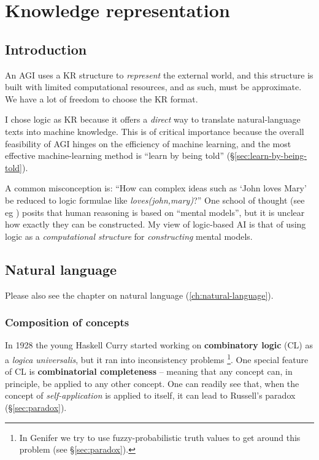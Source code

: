 \chapter{Knowledge representation}
\minitoc

\section{Introduction}

An AGI uses a KR structure to \textit{represent} the external world, and this structure is built with limited computational resources, and as such, must be approximate.  We have a lot of freedom to choose the KR format.

I chose logic as KR because it offers a \textit{direct} way to translate natural-language texts into machine knowledge.  This is of critical importance because the overall feasibility of AGI hinges on the efficiency of machine learning, and the most effective machine-learning method is ``learn by being told'' (\S\ref{sec:learn-by-being-told}).

A common misconception is:  ``How can complex ideas such as `John loves Mary' be reduced to logic formulae like \textit{loves(john,mary)}?''  One school of thought (see eg \citep*{Johnson-Laird1983}) posits that human reasoning is based on ``mental models'', but it is unclear how exactly they can be constructed.  My view of logic-based AI is that of using logic as a \textit{computational structure} for \textit{constructing} mental models.


\section{Natural language}

Please also see the chapter on natural language (\ref{ch:natural-language}).

\subsection{Composition of concepts}
\label{sec:composition}

In 1928 the young Haskell Curry started working on \textbf{combinatory logic} (CL) as a \textit{logica universalis}, but it ran into inconsistency problems \footnote{In Genifer we try to use fuzzy-probabilistic truth values to get around this problem (see \S\ref{sec:paradox}).}.  One special feature of CL is \textbf{combinatorial completeness} -- meaning that any concept can, in principle, be applied to any other concept.  One can readily see that, when the concept of \textit{self-application} is applied to itself, it can lead to Russell's paradox (\S\ref{sec:paradox}).

